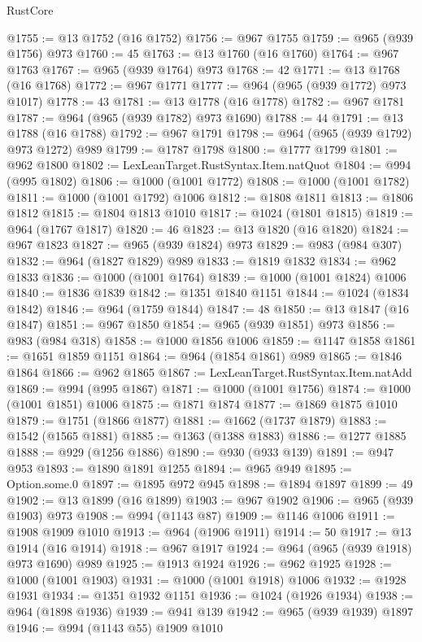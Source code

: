 \begin{lexlean}{RustCore}
\begin{coremodule}
@1755 := @13 @1752 (@16 @1752)
@1756 := @967 @1755
@1759 := @965 (@939 @1756) @973
@1760 := 45
@1763 := @13 @1760 (@16 @1760)
@1764 := @967 @1763
@1767 := @965 (@939 @1764) @973
@1768 := 42
@1771 := @13 @1768 (@16 @1768)
@1772 := @967 @1771
@1777 := @964 (@965 (@939 @1772) @973 @1017)
@1778 := 43
@1781 := @13 @1778 (@16 @1778)
@1782 := @967 @1781
@1787 := @964 (@965 (@939 @1782) @973 @1690)
@1788 := 44
@1791 := @13 @1788 (@16 @1788)
@1792 := @967 @1791
@1798 := @964 (@965 (@939 @1792) @973 @1272) @989
@1799 := @1787 @1798
@1800 := @1777 @1799
@1801 := @962 @1800
@1802 := LexLeanTarget.RustSyntax.Item.natQuot
@1804 := @994 (@995 @1802)
@1806 := @1000 (@1001 @1772)
@1808 := @1000 (@1001 @1782)
@1811 := @1000 (@1001 @1792) @1006
@1812 := @1808 @1811
@1813 := @1806 @1812
@1815 := @1804 @1813 @1010
@1817 := @1024 (@1801 @1815)
@1819 := @964 (@1767 @1817)
@1820 := 46
@1823 := @13 @1820 (@16 @1820)
@1824 := @967 @1823
@1827 := @965 (@939 @1824) @973
@1829 := @983 (@984 @307)
@1832 := @964 (@1827 @1829) @989
@1833 := @1819 @1832
@1834 := @962 @1833
@1836 := @1000 (@1001 @1764)
@1839 := @1000 (@1001 @1824) @1006
@1840 := @1836 @1839
@1842 := @1351 @1840 @1151
@1844 := @1024 (@1834 @1842)
@1846 := @964 (@1759 @1844)
@1847 := 48
@1850 := @13 @1847 (@16 @1847)
@1851 := @967 @1850
@1854 := @965 (@939 @1851) @973
@1856 := @983 (@984 @318)
@1858 := @1000 @1856 @1006
@1859 := @1147 @1858
@1861 := @1651 @1859 @1151
@1864 := @964 (@1854 @1861) @989
@1865 := @1846 @1864
@1866 := @962 @1865
@1867 := LexLeanTarget.RustSyntax.Item.natAdd
@1869 := @994 (@995 @1867)
@1871 := @1000 (@1001 @1756)
@1874 := @1000 (@1001 @1851) @1006
@1875 := @1871 @1874
@1877 := @1869 @1875 @1010
@1879 := @1751 (@1866 @1877)
@1881 := @1662 (@1737 @1879)
@1883 := @1542 (@1565 @1881)
@1885 := @1363 (@1388 @1883)
@1886 := @1277 @1885
@1888 := @929 (@1256 @1886)
@1890 := @930 (@933 @139)
@1891 := @947 @953
@1893 := @1890 @1891 @1255
@1894 := @965 @949
@1895 := Option.some.{0}
@1897 := @1895 @972 @945
@1898 := @1894 @1897
@1899 := 49
@1902 := @13 @1899 (@16 @1899)
@1903 := @967 @1902
@1906 := @965 (@939 @1903) @973
@1908 := @994 (@1143 @87)
@1909 := @1146 @1006
@1911 := @1908 @1909 @1010
@1913 := @964 (@1906 @1911)
@1914 := 50
@1917 := @13 @1914 (@16 @1914)
@1918 := @967 @1917
@1924 := @964 (@965 (@939 @1918) @973 @1690) @989
@1925 := @1913 @1924
@1926 := @962 @1925
@1928 := @1000 (@1001 @1903)
@1931 := @1000 (@1001 @1918) @1006
@1932 := @1928 @1931
@1934 := @1351 @1932 @1151
@1936 := @1024 (@1926 @1934)
@1938 := @964 (@1898 @1936)
@1939 := @941 @139
@1942 := @965 (@939 @1939) @1897
@1946 := @994 (@1143 @55) @1909 @1010

\end{coremodule}
\end{lexlean}
